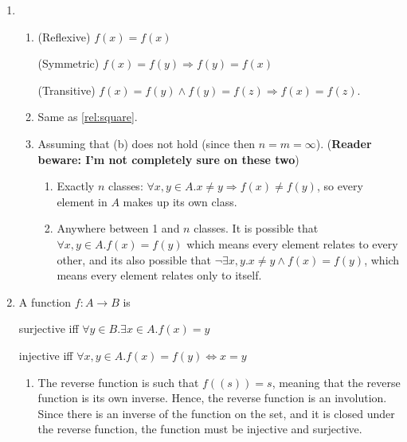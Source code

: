 \documentclass{article}
\begin{document}
\begin{enumerate}
    \item 
        \begin{enumerate}
            \item (Reflexive) $f(x) = f(x)$
                
                (Symmetric) $f(x) = f(y) \Rightarrow f(y) = f(x)$

                (Transitive) $f(x) = f(y) \land f(y) = f(z) \Rightarrow f(x) = f(z)$.
            \item
                Same as \ref{rel:square}.

            \item Assuming that (b) does not hold (since then $n=m=\infty$). (\textbf{Reader beware: I'm not completely sure on these two})

                \begin{enumerate}
                    \item Exactly $n$ classes: $\forall x,y \in A . x \neq y \Rightarrow f(x) \neq f(y)$, so every element in $A$ makes up its own class.
                    \item Anywhere between 1 and $n$ classes. It is possible that $\forall x,y \in A . f(x) = f(y)$ which means every element relates to every other, and its also possible that $\lnot\exists x,y . x \neq y \land f(x) = f(y)$, which means every element relates only to itself.
                \end{enumerate}
            
        \end{enumerate}

    \item
        A function $f : A \to B$ is

        surjective iff $\forall y \in B . \exists x \in A . f(x) = y$

        injective iff $\forall x,y \in A. f(x) = f(y) \Leftrightarrow x = y$

        \begin{enumerate}
            \item 
                The reverse function is such that $f((s)) = s$, meaning that the reverse function is its own inverse. Hence, the reverse function is an involution. Since there is an inverse of the function on the set, and it is closed under the reverse function, the function must be injective and surjective.
                

\end{enumerate}
\end{enumerate}
\end{document}
